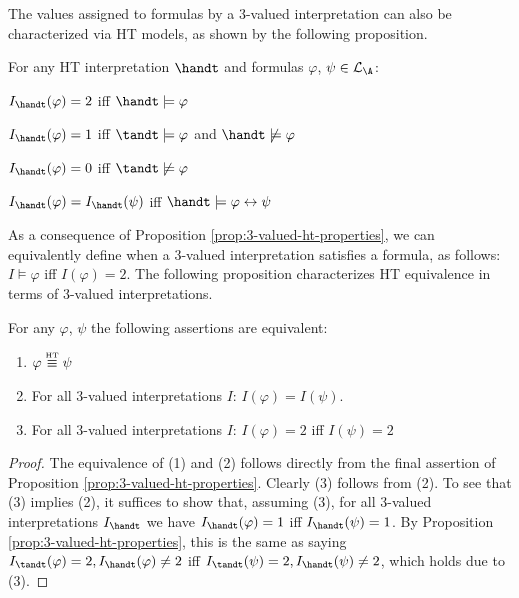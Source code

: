 The values assigned to formulas by a 3-valued interpretation can also
be characterized via HT models, as shown by the following proposition.

\begin{proposition}\label{prop:3-valued-ht-properties}
For any HT interpretation $\handt$ and formulas $\varphi$, $\psi \in \langa$:
\begin{description}
  \item $I_{\handt}(\varphi) = 2$ iff $\handt \models \varphi$
  \item $I_{\handt}(\varphi) = 1$ iff $\tandt \models \varphi$ and $\handt \not\models \varphi$
  \item $I_{\handt}(\varphi) = 0$ iff $\tandt \not\models \varphi$
  \item  $I_{\handt}(\varphi) = I_{\handt}(\psi)$ iff $\handt \models \varphi \leftrightarrow \psi$
\end{description}
\end{proposition}

As a consequence of Proposition \ref{prop:3-valued-ht-properties}, we can
equivalently define when a 3-valued interpretation satisfies a
formula, as follows: $I \models \varphi$ iff $I(\varphi)=2$. The
following proposition characterizes HT equivalence in terms of
3-valued interpretations.

\begin{proposition}
For any $\varphi$, $\psi$ the following assertions are equivalent:
  \begin{enumerate}[label={(\arabic*)}]
    \setlength\itemsep{0.15em}
    \item $\varphi \stackrel{\normalfont\mbox{\tiny HT}}{\equiv} \psi$
    \item For all 3-valued interpretations $I$: $I(\varphi) = I(\psi)$.
    \item For all 3-valued interpretations $I$: $I(\varphi) = 2$ iff $I(\psi) = 2$
  \end{enumerate}
\end{proposition}
\begin{proof}
  The equivalence of (1) and (2) follows directly from the final
  assertion of Proposition \ref{prop:3-valued-ht-properties}. Clearly
  (3) follows from (2). To see that (3) implies (2), it suffices to
  show that, assuming (3), for all 3-valued interpretations
  $I_{\handt}$ we have $I_{\handt}(\varphi) = 1$ iff
  $I_{\handt}(\psi) = 1$. By Proposition
  \ref{prop:3-valued-ht-properties}, this is the same as saying
  $I_{\tandt}(\varphi) = 2, I_{\handt}(\varphi) \neq 2$ iff
  $I_{\tandt}(\psi)=2, I_{\handt}(\psi) \neq 2$, which holds due to
  (3).
\end{proof}

